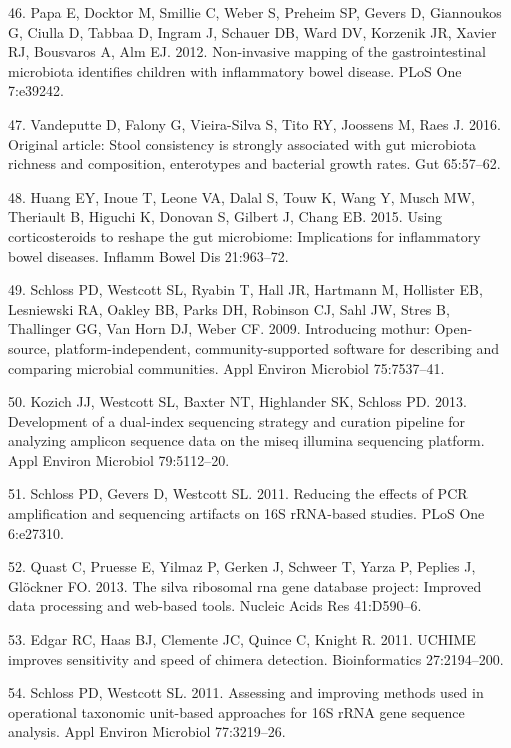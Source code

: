 \documentclass[12pt,]{article}
\begin{document}
\hypertarget{ref-papa_pedsIBD_2012}{}
46. Papa E, Docktor M, Smillie C, Weber S, Preheim SP, Gevers D,
Giannoukos G, Ciulla D, Tabbaa D, Ingram J, Schauer DB, Ward DV,
Korzenik JR, Xavier RJ, Bousvaros A, Alm EJ. 2012. Non-invasive mapping
of the gastrointestinal microbiota identifies children with inflammatory
bowel disease. PLoS One 7:e39242.

\hypertarget{ref-vandeputte_stoolcon_2016}{}
47. Vandeputte D, Falony G, Vieira-Silva S, Tito RY, Joossens M, Raes J.
2016. Original article: Stool consistency is strongly associated with
gut microbiota richness and composition, enterotypes and bacterial
growth rates. Gut 65:57--62.

\hypertarget{ref-huang_cort_2015}{}
48. Huang EY, Inoue T, Leone VA, Dalal S, Touw K, Wang Y, Musch MW,
Theriault B, Higuchi K, Donovan S, Gilbert J, Chang EB. 2015. Using
corticosteroids to reshape the gut microbiome: Implications for
inflammatory bowel diseases. Inflamm Bowel Dis 21:963--72.

\hypertarget{ref-schloss_mothur_2009}{}
49. Schloss PD, Westcott SL, Ryabin T, Hall JR, Hartmann M, Hollister
EB, Lesniewski RA, Oakley BB, Parks DH, Robinson CJ, Sahl JW, Stres B,
Thallinger GG, Van Horn DJ, Weber CF. 2009. Introducing mothur:
Open-source, platform-independent, community-supported software for
describing and comparing microbial communities. Appl Environ Microbiol
75:7537--41.

\hypertarget{ref-Kozich_MiSeqSOP_2013}{}
50. Kozich JJ, Westcott SL, Baxter NT, Highlander SK, Schloss PD. 2013.
Development of a dual-index sequencing strategy and curation pipeline
for analyzing amplicon sequence data on the miseq illumina sequencing
platform. Appl Environ Microbiol 79:5112--20.

\hypertarget{ref-schloss_PCRartifacts_2011}{}
51. Schloss PD, Gevers D, Westcott SL. 2011. Reducing the effects of PCR
amplification and sequencing artifacts on 16S rRNA-based studies. PLoS
One 6:e27310.

\hypertarget{ref-Quast_silva_2013}{}
52. Quast C, Pruesse E, Yilmaz P, Gerken J, Schweer T, Yarza P, Peplies
J, Glöckner FO. 2013. The silva ribosomal rna gene database project:
Improved data processing and web-based tools. Nucleic Acids Res
41:D590--6.

\hypertarget{ref-edgar_uchime_2011}{}
53. Edgar RC, Haas BJ, Clemente JC, Quince C, Knight R. 2011. UCHIME
improves sensitivity and speed of chimera detection. Bioinformatics
27:2194--200.

\hypertarget{ref-schloss_OTUanalysis_2011}{}
54. Schloss PD, Westcott SL. 2011. Assessing and improving methods used
in operational taxonomic unit-based approaches for 16S rRNA gene
sequence analysis. Appl Environ Microbiol 77:3219--26.
\end{document}
